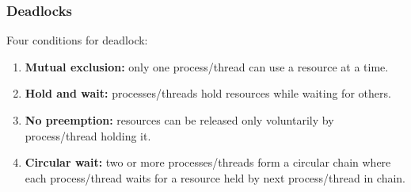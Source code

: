 \subsubsection{Deadlocks}
Four conditions for deadlock:
\begin{enumerate}
    \item \textbf{Mutual exclusion:} only one process/thread can use a resource at a time.
    \item \textbf{Hold and wait:} processes/threads hold resources while waiting for others.
    \item \textbf{No preemption:} resources can be released only voluntarily by process/thread holding it.
    \item \textbf{Circular wait:} two or more processes/threads form a circular chain where each process/thread waits for a resource held by next process/thread in chain.
\end{enumerate}